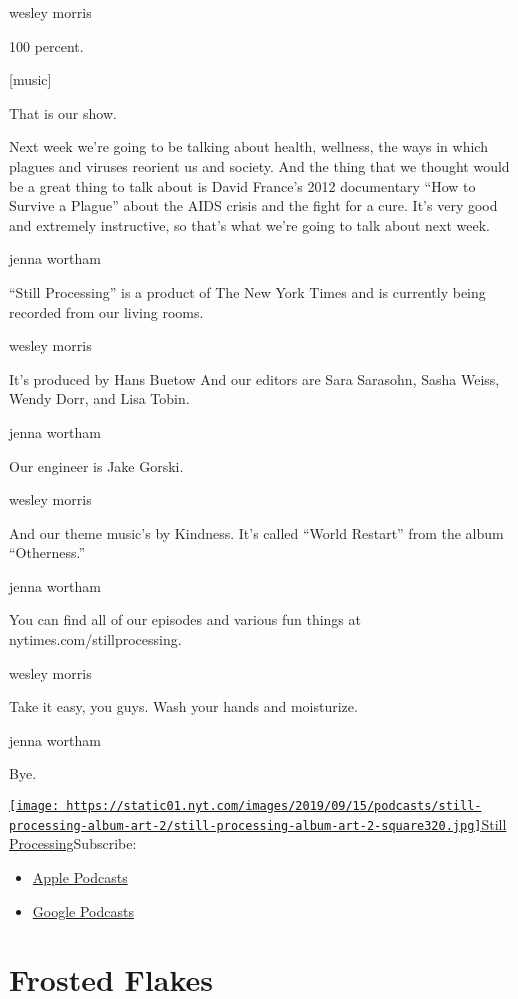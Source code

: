 wesley morris

100 percent.

{[}music{]}

That is our show.

Next week we're going to be talking about health, wellness, the ways in
which plagues and viruses reorient us and society. And the thing that we
thought would be a great thing to talk about is David France's 2012
documentary ``How to Survive a Plague'' about the AIDS crisis and the
fight for a cure. It's very good and extremely instructive, so that's
what we're going to talk about next week.

jenna wortham

``Still Processing'' is a product of The New York Times and is currently
being recorded from our living rooms.

wesley morris

It's produced by Hans Buetow And our editors are Sara Sarasohn, Sasha
Weiss, Wendy Dorr, and Lisa Tobin.

jenna wortham

Our engineer is Jake Gorski.

wesley morris

And our theme music's by Kindness. It's called ``World Restart'' from
the album ``Otherness.''

jenna wortham

You can find all of our episodes and various fun things at
nytimes.com/stillprocessing.

wesley morris

Take it easy, you guys. Wash your hands and moisturize.

jenna wortham

Bye.

\href{https://www.nytimes.com/column/still-processing-podcast}{\texttt{[image: https://static01.nyt.com/images/2019/09/15/podcasts/still-processing-album-art-2/still-processing-album-art-2-square320.jpg]}Still
Processing}Subscribe:

\begin{itemize}
\tightlist
\item
  \href{https://itunes.apple.com/us/podcast/id1151436460}{Apple
  Podcasts}
\item
  \href{https://www.google.com/podcasts?feed=aHR0cHM6Ly9yc3MuYXJ0MTkuY29tL255dC1zdGlsbC1wcm9jZXNzaW5n}{Google
  Podcasts}
\end{itemize}

\hypertarget{frosted-flakes-1}{%
\section{Frosted Flakes}\label{frosted-flakes-1}}

